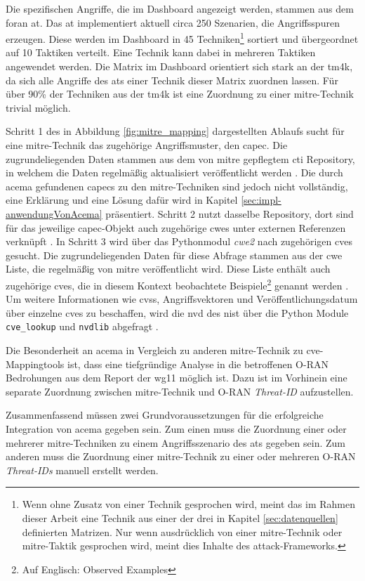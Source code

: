 \par Die spezifischen Angriffe, die im Dashboard angezeigt werden, stammen aus dem \gls{foran} \gls{at}. Das \gls{at} implementiert aktuell circa 250 Szenarien, die Angriffsspuren erzeugen. Diese werden im Dashboard in 45 Techniken\footnote{Wenn ohne Zusatz von einer Technik gesprochen wird, meint das im Rahmen dieser Arbeit eine Technik aus einer der drei in Kapitel \ref{sec:datenquellen} definierten Matrizen. Nur wenn ausdrücklich von einer \gls{mitre}-Technik oder \gls{mitre}-Taktik gesprochen wird, meint dies Inhalte des \gls{attack}-Frameworks.} sortiert und übergeordnet auf 10 Taktiken verteilt. Eine Technik kann dabei in mehreren Taktiken angewendet werden. Die Matrix im Dashboard orientiert sich stark an der \gls{tm4k}, da sich alle Angriffe des \gls{at}s einer Technik dieser Matrix zuordnen lassen. Für über 90\% der Techniken aus der \gls{tm4k} ist eine Zuordnung zu einer \gls{mitre}-Technik trivial möglich.
\par Schritt 1 des in Abbildung \ref{fig:mitre_mapping} dargestellten Ablaufs sucht für eine \gls{mitre}-Technik das zugehörige Angriffsmuster, den \gls{capec}. Die zugrundeliegenden Daten stammen aus dem von \gls{mitre} gepflegtem \gls{cti} Repository, in welchem die Daten regelmäßig aktualisiert veröffentlicht werden \autocite{MitreCtiCyber}. Die durch \gls{acema} gefundenen \glspl{capec} zu den \gls{mitre}-Techniken sind jedoch nicht vollständig, eine Erklärung und eine Lösung dafür wird in Kapitel \ref{sec:impl-anwendungVonAcema} präsentiert. Schritt 2 nutzt dasselbe Repository, dort sind für das jeweilige \gls{capec}-Objekt auch zugehörige \glspl{cwe} unter externen Referenzen verknüpft \autocite{CtiUSAGEmdMaster}. In Schritt 3 wird über das Pythonmodul \textit{cwe2} nach zugehörigen \glspl{cve} gesucht. Die zugrundeliegenden Daten für diese Abfrage stammen aus der \gls{cwe} Liste, die regelmäßig von \gls{mitre} veröffentlicht wird. Diese Liste enthält auch zugehörige \glspl{cve}, die in diesem Kontext \glqq{}beobachtete Beispiele\grqq{}\footnote{Auf Englisch: \glqq{}Observed Examples\grqq} genannt werden \autocite{AboutcodeorgCwe22024,CWEDownloads}. Um weitere Informationen wie \gls{cvss}, Angriffsvektoren und Veröffentlichungsdatum über einzelne \glspl{cve} zu beschaffen, wird die \gls{nvd} des \gls{nist} über die Python Module \verb|cve_lookup| und \verb|nvdlib| abgefragt \autocite{NVDLibNVDLibNIST,MachineThingCve_lookupLook,NVDHome}.
\par Die Besonderheit an \gls{acema} in Vergleich zu anderen \gls{mitre}-Technik zu \gls{cve}-Mappingtools ist, dass eine tiefgründige Analyse in die betroffenen O-RAN Bedrohungen aus dem Report der \gls{wg11} möglich ist. Dazu ist im Vorhinein eine separate Zuordnung zwischen \gls{mitre}-Technik und O-RAN \textit{Threat-ID} aufzustellen. 
\par Zusammenfassend müssen zwei Grundvoraussetzungen für die erfolgreiche Integration von \gls{acema} gegeben sein. Zum einen muss die Zuordnung einer oder mehrerer \gls{mitre}-Techniken zu einem Angriffsszenario des \gls{at}s gegeben sein. Zum anderen muss die Zuordnung einer \gls{mitre}-Technik zu einer oder mehreren O-RAN \textit{Threat-IDs} manuell erstellt werden.

